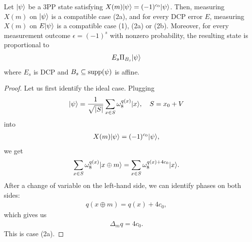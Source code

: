 \begin{theorem}
    \label{thm:deterministic-measurements-noise}
    Let $|\psi\rangle$ be a 3PP state satisfying $X(m) |\psi\rangle=(-1)^{c_0} |\psi\rangle$. Then, measuring $X(m)$ on $|\psi\rangle$ is a compatible case (2a), and for every DCP error $E$, measuring $X(m)$ on $E|\psi\rangle$ is a compatible case (1), (2a) or (2b). Moreover, for every measurement outcome $\epsilon = (-1)^s$ with nonzero probability, the resulting state is proportional to
    \begin{align}
        E_s\Pi_{B_s} |\psi\rangle
    \end{align}
    where $E_s$ is DCP and $B_s\subseteq \operatorname{supp}(\psi)$ is affine.
\end{theorem}
\begin{proof}
    Let us first identify the ideal case. Plugging
    \begin{align}
        |\psi\rangle=\frac{1}{\sqrt{|S|}} \sum_{x \in S} \omega_8^{q(x)} |x\rangle,\quad S = x_0 + V
    \end{align}
    into
    \begin{align}
        X(m) |\psi\rangle = (-1)^{c_0} |\psi\rangle,
    \end{align}
    we get
    \begin{align}
        \sum_{x \in S} \omega_8^{q(x)} |x\oplus m\rangle = \sum_{x \in S} \omega_8^{q(x)+4c_0} |x\rangle.
    \end{align}
    After a change of variable on the left-hand side, we can identify phases on both sides:
    \begin{align}
        q(x\oplus m)= q(x)+4c_0,
    \end{align}
    which gives us
    \begin{align}
        \Delta_m q = 4c_0.
    \end{align}
    This is case (2a).


\end{proof}
